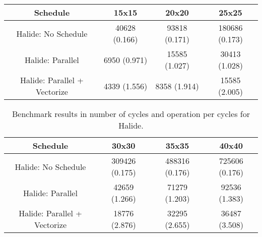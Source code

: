 
\begin{table}[ht]
\begin{center}
\begin{tabular}{|c||c|c|c|}
\hline
Schedule& 15x15& 20x20& 25x25\\ 
\hline
\hline
Halide: No Schedule& 40628 (0.166)& 93818 (0.171)& 180686 (0.173)\\ 
\hline
Halide: Parallel& 6950 (0.971)& 15585 (1.027)& 30413 (1.028)\\ 
\hline
Halide: Parallel + Vectorize& 4339 (1.556)& 8358 (1.914)& 15585 (2.005)\\ 
\hline

\end{tabular}
\end{center}
\end{table}


\begin{table}[ht]
\begin{center}
\begin{tabular}{|c||c|c|c|}
\hline
Schedule& 30x30& 35x35& 40x40\\ 
\hline
\hline
Halide: No Schedule& 309426 (0.175)& 488316 (0.176)& 725606 (0.176)\\ 
\hline
Halide: Parallel& 42659 (1.266)& 71279 (1.203)& 92536 (1.383)\\ 
\hline
Halide: Parallel + Vectorize& 18776 (2.876)& 32295 (2.655)& 36487 (3.508)\\ 
\hline

\end{tabular}
\end{center}
	\caption{ Benchmark results in number of cycles and operation per cycles for Halide.
	}
	\label{Table:BenchmarksHalide}
\end{table}

